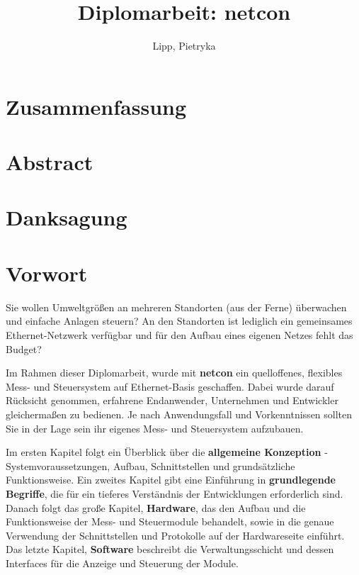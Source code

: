 \documentclass[a4paper,14pt,headsepline]{scrartcl}
\begin{document}
\author{Lipp, Pietryka} 
\title{Diplomarbeit: netcon} 
\date{} 
\maketitle

\newpage

\section*{Zusammenfassung}
\newpage

\section*{Abstract}
\newpage

\section*{Danksagung}
\newpage

\section*{Vorwort}
Sie wollen Umweltgrößen an mehreren Standorten (aus der Ferne) überwachen und einfache Anlagen steuern? An den Standorten ist lediglich ein gemeinsames Ethernet-Netzwerk verfügbar und für den Aufbau eines eigenen Netzes fehlt das Budget?

Im Rahmen dieser Diplomarbeit, wurde mit \textbf{netcon} ein quelloffenes, flexibles Mess- und Steuersystem auf Ethernet-Basis geschaffen. Dabei wurde darauf Rücksicht genommen, erfahrene Endanwender, Unternehmen und Entwickler gleichermaßen zu bedienen. Je nach Anwendungsfall und Vorkenntnissen sollten Sie in der Lage sein ihr eigenes Mess- und Steuersystem aufzubauen. 

Im ersten Kapitel folgt ein Überblick über die \textbf{allgemeine Konzeption} - Systemvoraussetzungen, Aufbau, Schnittstellen und grundsätzliche Funktionsweise. Ein zweites Kapitel gibt eine Einführung in \textbf{grundlegende Begriffe}, die für ein tieferes Verständnis der Entwicklungen erforderlich sind. Danach folgt das große Kapitel, \textbf{Hardware}, das den Aufbau und die Funktionsweise der Mess- und Steuermodule behandelt, sowie in die genaue Verwendung der Schnittstellen und Protokolle auf der Hardwareseite einführt. Das letzte Kapitel, \textbf{Software} beschreibt die Verwaltungsschicht und dessen Interfaces für die Anzeige und Steuerung der Module.  
\end{document}
